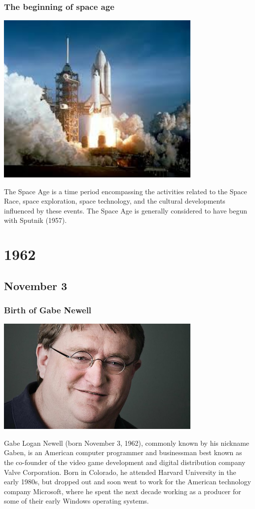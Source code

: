 \documentclass[11pt]{report}
\begin{document}
\subsection{The beginning of space age}
\vspace{2mm}\begin{center}\includegraphics[width=10cm]{./img/spaceage.jpg}\end{center}
The Space Age is a time period encompassing the activities related to the Space Race, space exploration, space technology, and the cultural developments influenced by these events. The Space Age is generally considered to have begun with Sputnik (1957).

\chapter{1962}
\section{November 3}
\subsection{Birth of Gabe Newell}
\vspace{2mm}\begin{center}\includegraphics[width=10cm]{./img/gaben.jpg}\end{center}
Gabe Logan Newell (born November 3, 1962), commonly known by his nickname Gaben, is an American computer programmer and businessman best known as the co-founder of the video game development and digital distribution company Valve Corporation. Born in Colorado, he attended Harvard University in the early 1980s, but dropped out and soon went to work for the American technology company Microsoft, where he spent the next decade working as a producer for some of their early Windows operating systems. \\
\end{document}
